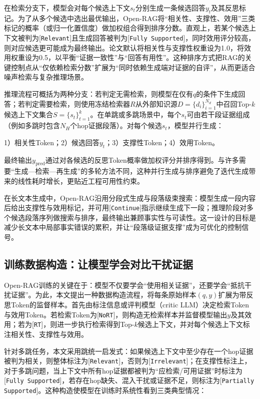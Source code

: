 在检索分支下，模型会对每个候选上下文$s_t$分别生成一条候选回答$y_t$及其反思标记。为了从多个候选中选出最优输出，Open-RAG将“相关性、支撑性、效用”三类标记的概率（或归一化置信度）做加权组合得到排序分数。直观上，若某个候选上下文被判为[\texttt{Relevant}]且生成回答被判为[\texttt{Fully Supported}]，同时效用评分较高，则对应候选更可能成为最终输出。论文默认将相关性与支撑性权重设为1.0，将效用权重设为0.5，以平衡“证据一致性”与“回答有用性”。这种排序方式把RAG的关键控制点从“仅依赖检索分数”扩展为“同时依赖生成端对证据的自评”，从而更适合噪声检索与复杂推理场景。
 
推理流程可概括为两种分支：若判定无需检索，则模型在仅有$q$的条件下生成回答；若判定需要检索，则使用冻结检索器$R$从外部知识源$D=\{d_i\}_{i=1}^{N_d}$中召回Top-$k$候选上下文集合$S=\{s_t\}_{t=1}^{k}$。在单跳或多跳场景中，每个$s_t$可由若干段证据组成（例如多跳时包含$N_H$个hop证据段落）。对每个候选$s_t$，模型并行生成：
 
1）相关性Token；2）候选回答$y_t$；3）支撑性Token；4）效用Token。
 
最终输出$y_{\text{pred}}$通过对各候选的反思Token概率做加权评分并排序得到。与许多需要“生成—检索—再生成”的多轮方法不同，这种并行生成与排序避免了迭代生成带来的线性耗时增长，更贴近工程可用性约束。

在长文本生成中，Open-RAG沿用分段式生成与段落级束搜索：模型生成一段内容后给出支撑性与效用标记，并可用[\texttt{Continue}]指示继续生成下一段；推理阶段对多个候选段落序列做搜索与排序，最终输出兼顾事实性与可读性。这一设计的目标是减少长文本中局部事实错误的累积，并让“段落级证据支撑”成为可优化的控制信号。
 
\subsection{训练数据构造：让模型学会对比干扰证据}
Open-RAG训练的关键在于：模型不仅要学会“使用相关证据”，还要学会“抵抗干扰证据”。为此，本文提出一种数据构造流程，将每条原始样本$(q,y)$扩展为带反思Token的监督样本。首先由标注信息或评判模型（critic LLM）决定检索Token与效用Token。若检索Token为[\texttt{NoRT}]，则构造无检索样本并监督模型输出$y$及其效用；若为[\texttt{RT}]，则进一步执行检索得到Top-$k$候选上下文，并对每个候选上下文标注相关性、支撑性与效用。
 
针对多跳任务，本文采用跳统一启发式：如果候选上下文中至少存在一个hop证据被判为相关，则整体标注为[\texttt{Relevant}]，否则为[\texttt{Irrelevant}]；在支撑性标注上，对于多跳问题，当上下文中所有hop证据都被判为“应检索/可用证据”时标注为[\texttt{Fully Supported}]，若存在hop缺失、混入干扰或证据不足，则标注为[\texttt{Partially Supported}]。这种构造使模型在训练时系统性看到三类典型情况：
 
